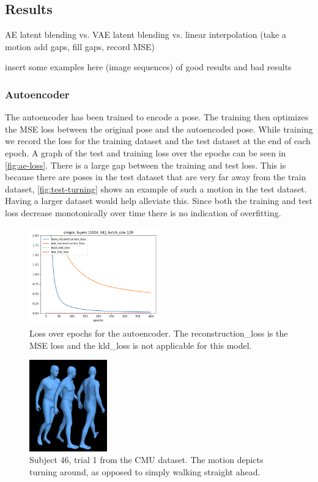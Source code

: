\subsection{Results}\label{subsec:results}
AE latent blending vs. VAE latent blending vs. linear interpolation (take a motion add gaps, fill gaps, record MSE)

insert some examples here (image sequences) of good results and bad results

\subsubsection{Autoencoder}\label{subsubsec:autoencoder}
The autoencoder has been trained to encode a pose. The training then optimizes the MSE loss between the original pose and the autoencoded pose. While training we record the loss for the training dataset and the test dataset at the end of each epoch. A graph of the test and training loss over the epochs can be seen in \autoref{fig:ae-loss}. There is a large gap between the training and test loss. This is because there are poses in the test dataset that are very far away from the train dataset, \autoref{fig:test-turning} shows an example of such a motion in the test dataset. Having a larger dataset would help alleviate this. Since both the training and test loss decrease monotonically over time there is no indication of overfitting.

\begin{figure}[h]
\centering
\includegraphics[width=0.5\textwidth]{img/simple_1024-64_batch-128_losses}
\caption{Loss over epochs for the autoencoder. The reconstruction\_loss is the MSE loss and the kld\_loss is not applicable for this model.}
\label{fig:ae-loss}
\end{figure}

\begin{figure}[h]
\centering
\includegraphics[width=0.3\textwidth]{img/46_01_turning}
\caption{Subject 46, trial 1 from the CMU dataset. The motion depicts turning around, as opposed to simply walking straight ahead.}
\label{fig:test-turning}
\end{figure}


